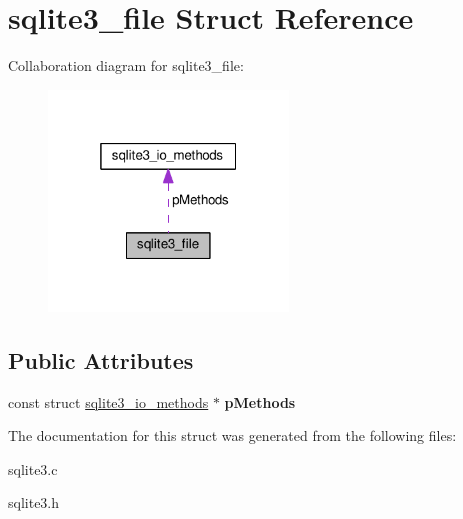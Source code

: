 \hypertarget{structsqlite3__file}{}\section{sqlite3\+\_\+file Struct Reference}
\label{structsqlite3__file}


Collaboration diagram for sqlite3\+\_\+file\+:\nopagebreak
\begin{figure}[H]
\begin{center}
\leavevmode
\includegraphics[width=181pt]{structsqlite3__file__coll__graph}
\end{center}
\end{figure}
\subsection*{Public Attributes}
\begin{DoxyCompactItemize}
\item 
const struct \hyperlink{structsqlite3__io__methods}{sqlite3\+\_\+io\+\_\+methods} $\ast$ {\bfseries p\+Methods}\hypertarget{structsqlite3__file_afbe27b40382393e63784a4d4b43f3ad7}{}\label{structsqlite3__file_afbe27b40382393e63784a4d4b43f3ad7}

\end{DoxyCompactItemize}


The documentation for this struct was generated from the following files\+:\begin{DoxyCompactItemize}
\item 
sqlite3.\+c\item 
sqlite3.\+h\end{DoxyCompactItemize}
